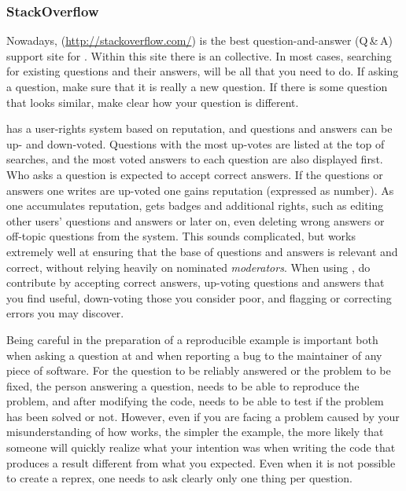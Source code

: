 \documentclass[krantz2]{krantz}\usepackage{knitr}
\begin{document}
\subsubsection*{StackOverflow}

Nowadays, \stackoverflow (\url{http://stackoverflow.com/}) is the best question-and-answer (Q\,\&\,A) support site for \Rpgrm. Within this site there is an \Rlang collective. In most cases, searching for existing questions and their answers, will be all that you need to do. If asking a question, make sure that it is really a new question. If there is some question that looks similar, make clear how your question is different.

\stackoverflow has a user-rights system based on reputation, and questions and answers can be up- and down-voted. Questions with the most up-votes are listed at the top of searches, and the most voted answers to each question are also displayed first. Who asks a question is expected to accept correct answers. If the questions or answers one writes are up-voted one gains reputation (expressed as number). As one accumulates reputation, gets badges and additional rights, such as editing other users' questions and answers or later on, even deleting wrong answers or off-topic questions from the system. This sounds complicated, but works extremely well at ensuring that the base of questions and answers is relevant and correct, without relying heavily on nominated \emph{moderators}. When using \stackoverflow, do contribute by accepting correct answers, up-voting questions and answers that you find useful, down-voting those you consider poor, and flagging or correcting errors you may discover.

Being careful in the preparation of a reproducible example is important both when asking a question at \stackoverflow and when reporting a bug to the maintainer of any piece of software. For the question to be reliably answered or the problem to be fixed, the person answering a question, needs to be able to reproduce the problem, and after modifying the code, needs to be able to test if the problem has been solved or not. However, even if you are facing a problem caused by your misunderstanding of how \Rlang works, the simpler the example, the more likely that someone will quickly realize what your intention was when writing the code that produces a result different from what you expected. Even when it is not possible to create a reprex, one needs to ask clearly only one thing per question.
\end{document}
